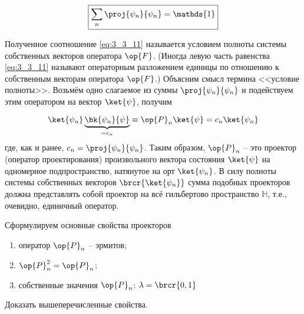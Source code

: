 \begin{equation}
\label{eq:3_3_11}
\boxed {
	\sum_n \proj{\psi_n}{\psi_n} = \mathds{1}
}
\end{equation}

Полученное соотношение \eqref{eq:3_3_11} называется условием полноты системы собственных векторов оператора $\op{F}$. (Иногда левую часть равенства \eqref{eq:3_3_11} называют операторным разложением единицы по отношению к собственным векторам оператора $\op{F}$.) Объясним смысл термина <<условие полноты>>. Возьмём одно слагаемое из суммы $\proj{\psi_n}{\psi_n}$ и подействуем этим оператором на вектор $\ket{\psi}$, получим

\begin{equation}
\label{eq:3_3_12}
\ket{\psi_n} \underbrace{\bk{\psi_n}{\psi}}_{ = c_n} \equiv
  \op{P}_n \ket{\psi} = c_n \ket{\psi_n}
\end{equation}%
%
где, как и ранее, $c_n = \proj{\psi_n}{\psi_n}$. Таким образом, $\op{P}_n$ -- это проектор (оператор проектирования) произвольного вектора состояния $\ket{\psi}$ на одномерное подпространство, натянутое на орт $\ket{\psi_n}$. В силу полноты системы собственных векторов $\brcr{\ket{\psi_n}}$ сумма подобных проекторов должна представлять собой проектор на всё гильбертово пространство $\mathbb{H}$, т.е., очевидно, единичный оператор.

Сформулируем основные свойства проекторов

\begin{enumerate}
\item оператор $\op{P}_n$ -- эрмитов;
\item $\op{P}_n^2 = \op{P}_n$; ~~\footnotemark
\item собственные значения $\op{P}_n$: $\lambda = \brcr{0, 1}$
\end{enumerate}

\begin{excr}
Доказать вышеперечисленные свойства.
\end{excr}


